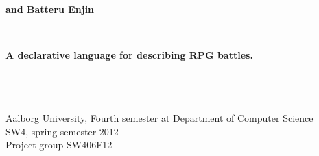 \thispagestyle{empty}
\begin{center}
	\hrulefill\newline
	\\
	\begin{LARGE}	
	\textbf{\langname and Batteru Enjin}
	\end{LARGE}
	\\
	\begin{large} 
	\textbf{A declarative language for describing RPG battles.}
	\end{large}\\
	\hrulefill\newline
	\\~\\
	Aalborg University, Fourth semester at Department of Computer Science \\
	SW4, spring semester 2012	\\
	Project group SW406F12\\
\end{center}
